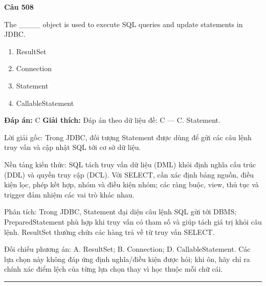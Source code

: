 \documentclass[11pt,a4paper]{article}
\newenvironment{question}[1]{%
  \par\vspace{1em}\noindent\textbf{\large Câu #1}\par\vspace{0.4em}
}{%
  \par\vspace{1em}\hrule\vspace{0.6em}
}
\newenvironment{choices}{%
  \begin{enumerate}[label=\textbf{\Alph*.},leftmargin=2.2em,itemsep=2pt,topsep=3pt]
}{%
  \end{enumerate}
}
\newcommand{\choice}{\item}
\begin{document}
\begin{question}{508}
The ____ object is used to execute SQL queries and update statements in JDBC.
\begin{choices}
\choice ResultSet
\choice Connection
\choice Statement
\choice CallableStatement
\end{choices}
\textbf{Đáp án:} C
\textbf{Giải thích:} Đáp án theo dữ liệu đề: C — C. Statement.

Lời giải gốc: Trong JDBC, đối tượng Statement được dùng để gửi các câu lệnh truy vấn và cập nhật SQL tới cơ sở dữ liệu.

Nền tảng kiến thức: SQL tách truy vấn dữ liệu (DML) khỏi định nghĩa cấu trúc (DDL) và quyền truy cập (DCL). Với SELECT, cần xác định bảng nguồn, điều kiện lọc, phép kết hợp, nhóm và điều kiện nhóm; các ràng buộc, view, thủ tục và trigger đảm nhiệm các vai trò khác nhau.

Phân tích: Trong JDBC, Statement đại diện câu lệnh SQL gửi tới DBMS; PreparedStatement phù hợp khi truy vấn có tham số và giúp tách giá trị khỏi câu lệnh. ResultSet thường chứa các hàng trả về từ truy vấn SELECT.

Đối chiếu phương án: A. ResultSet; B. Connection; D. CallableStatement. Các lựa chọn này không đáp ứng định nghĩa/điều kiện được hỏi; khi ôn, hãy chỉ ra chính xác điểm lệch của từng lựa chọn thay vì học thuộc mỗi chữ cái.
\end{question}
\end{document}
